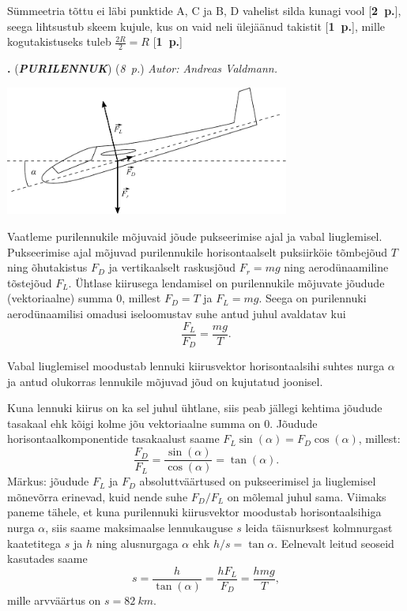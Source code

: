 \documentclass[12pt,a5paper]{article}
\newcommand{\numb}[1]{\vspace{5pt}\textbf{\large #1}}
\newcommand{\nimi}[1]{(\textsl{\small #1})}
\newcommand{\punktid}[1]{(\emph{#1~p.})}
\newcounter{ylesanne}
\newcommand{\yl}[1]{\addtocounter{ylesanne}{1}\numb{\theylesanne.} \nimi{\bf{#1}} \newblock{}}
\newcommand{\pp}[1]{[\textbf{#1~p.}]}
\newcommand{\autor}[1]{\emph{ Autor: #1.\\}}
\begin{document}
Sümmeetria tõttu ei läbi punktide A, C ja B, D vahelist silda kunagi vool \pp{2}, seega lihtsustub skeem
kujule, kus on vaid neli ülejäänud takistit \pp{1}, mille kogutakistuseks tuleb $\frac{2R}{2} = R$ \pp{1}

\yl{PURILENNUK} \punktid{8} \autor{Andreas Valdmann}
\begin{center}
	\vspace{-30pt}
  \includegraphics[width=0.7\textwidth]{purilennuk_joonis.pdf}
\end{center}


Vaatleme purilennukile mõjuvaid jõude pukseerimise ajal ja vabal liuglemisel. Pukseerimise ajal mõjuvad purilennukile horisontaalselt puksiirköie tõmbejõud $T$ ning õhutakistus $F_D$ ja vertikaalselt raskusjõud $F_r = mg$ ning aerodünaamiline tõstejõud $F_L$. Ühtlase kiirusega lendamisel on purilennukile mõjuvate jõudude (vektoriaalne) summa 0, millest $F_D = T$ ja $F_L = mg$. Seega on purilennuki aerodünaamilisi omadusi iseloomustav suhe antud juhul avaldatav kui
\begin{equation}
	\frac{F_L}{F_D} = \frac{mg}{T}.
\end{equation}

Vabal liuglemisel moodustab lennuki kiirusvektor horisontaalsihi suhtes nurga $\alpha$ ja antud olukorras lennukile mõjuvad jõud on kujutatud joonisel.


Kuna lennuki kiirus on ka sel juhul ühtlane, siis peab jällegi kehtima jõudude tasakaal ehk kõigi kolme jõu vektoriaalne summa on 0. Jõudude horisontaalkomponentide tasakaalust saame $F_L\sin(\alpha) = F_D\cos(\alpha)$, millest:
\begin{equation}
	\frac{F_D}{F_L} = \frac{\sin(\alpha)}{\cos(\alpha)}=\tan(\alpha).
\end{equation}
Märkus: jõudude $F_L$ ja $F_D$ absoluttväärtused on pukseerimisel ja liuglemisel mõnevõrra erinevad, kuid nende suhe $F_D/F_L$ on mõlemal juhul sama.
Viimaks paneme tähele, et kuna purilennuki kiirusvektor moodustab horisontaalsihiga nurga $\alpha$, siis saame maksimaalse lennukauguse $s$ leida täisnurksest kolmnurgast kaatetitega $s$ ja $h$ ning alusnurgaga $\alpha$ ehk $h/s = \tan{\alpha}$. Eelnevalt leitud seoseid kasutades saame
\begin{equation}
s = \frac{h}{\tan(\alpha)} = \frac{hF_L}{F_D} = \frac{hmg}{T},
\end{equation}
mille arvväärtus on $s = \SI{82}{km}$.
\end{document}
